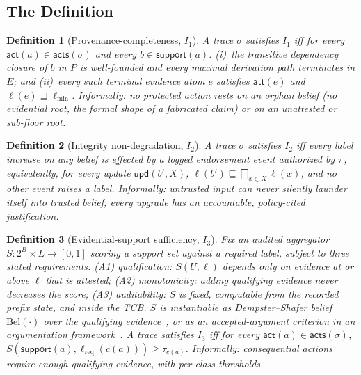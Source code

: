 \documentclass[conference,compsoc]{IEEEtran}
\newtheorem{definition}{Definition}
\theoremstyle{definition}
\theoremstyle{plain}
\newcommand{\Ione}{\ensuremath{I_1}}
\newcommand{\Itwo}{\ensuremath{I_2}}
\newcommand{\Ithree}{\ensuremath{I_3}}
\newcommand{\att}{\ensuremath{\mathsf{att}}}
\newcommand{\support}{\ensuremath{\mathsf{support}}}
\newcommand{\acts}{\ensuremath{\mathsf{acts}}}
\newcommand{\ev}[1]{\ensuremath{\mathsf{#1}}}
\newcommand{\lmin}{\ensuremath{\ell_{\min}}}
\newcommand{\lreq}{\ensuremath{\ell_{\mathrm{req}}}}
\begin{document}
\subsection{The Definition}
\begin{definition}[Provenance-completeness, \Ione]
\label{def:i1}
A trace $\sigma$ satisfies \Ione{} iff for every
$\ev{act}(a) \in \acts(\sigma)$ and every $b \in \support(a)$:
(i)~the transitive dependency closure of $b$ in $P$ is
well-founded and every maximal derivation path terminates in $E$;
and (ii)~every such terminal evidence atom $e$ satisfies $\att(e)$
and $\ell(e) \sqsupseteq \lmin$. Informally: no protected action
rests on an orphan belief (no evidential root, the formal shape
of a fabricated claim) or on an unattested or sub-floor root.
\end{definition}

\begin{definition}[Integrity non-degradation, \Itwo]
\label{def:i2}
A trace $\sigma$ satisfies \Itwo{} iff every label increase on any
belief is effected by a logged endorsement event authorized by
$\pi$; equivalently, for every update $\ev{upd}(b', X)$,
$\ell(b') \sqsubseteq \bigsqcap_{x \in X} \ell(x)$, and no other
event raises a label. Informally: untrusted input can never
silently launder itself into trusted belief; every upgrade has an
accountable, policy-cited justification.
\end{definition}

\begin{definition}[Evidential-support sufficiency, \Ithree]
\label{def:i3}
Fix an audited aggregator $S : 2^{B} \times L \to [0,1]$ scoring a
support set against a required label, subject to three stated
requirements: \emph{(A1) qualification}: $S(U, \ell)$ depends only
on evidence at or above $\ell$ that is attested;
\emph{(A2) monotonicity}: adding qualifying evidence never
decreases the score; \emph{(A3) auditability}: $S$ is fixed,
computable from the recorded prefix state, and inside the TCB.
$S$ is instantiable as Dempster--Shafer belief $\mathrm{Bel}(\cdot)$
over the qualifying evidence~\cite{shafer}, or as an
accepted-argument criterion in an argumentation
framework~\cite{dung}. A trace satisfies \Ithree{} iff for every
$\ev{act}(a) \in \acts(\sigma)$,
$S(\support(a), \lreq(c(a))) \geq \tau_{c(a)}$. Informally:
consequential actions require enough qualifying evidence, with
per-class thresholds.
\end{definition}
\end{document}
